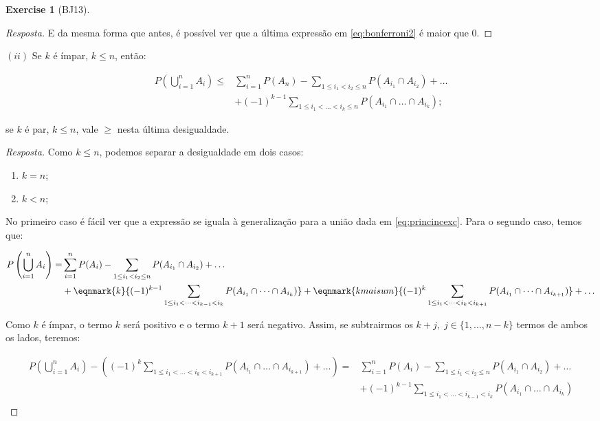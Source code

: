 \documentclass[
]{article}
\providecommand{\tightlist}{%
  \setlength{\itemsep}{0pt}\setlength{\parskip}{0pt}}
\theoremstyle{definition}
\theoremstyle{definition}
\theoremstyle{definition}
\newtheorem{exercise}{Exercise}[section]
\theoremstyle{definition}
\theoremstyle{remark}
\begin{document}
\begin{exercise}[BJ13]
\begin{proof}[Resposta]
E da mesma forma que antes, é possível ver que a última expressão em \eqref{eq:bonferroni2} é maior que 0.
\end{proof}

\((ii)\) Se \(k\) é ímpar, \(k \le n\), então:

\begin{align*}
P\left(\bigcup_{i=1}^{n} A_{i}\right) \le &\sum_{i=1}^{n}P(A_{n}) - \sum_{1 \le i_{1} < i_{2} \le n}P(A_{i_{1}} \cap A_{i_{2}}) + \dots \\
&+ (-1)^{k-1} \sum_{1 \le i_{1} < \dots < i_{k} \le n}P(A_{i_{1}} \cap \dots \cap A_{i_{k}});
\end{align*}

se \(k\) é par, \(k \le n\), vale \(\ge\) nesta última desigualdade.

\begin{proof}[Resposta]
Como \(k \le n\), podemos separar a desigualdade em dois casos:

\begin{enumerate}
\def\labelenumi{\arabic{enumi}.}
\tightlist
\item
  \(k = n\);
\item
  \(k < n\);
\end{enumerate}

No primeiro caso é fácil ver que a expressão se iguala à generalização para a união dada em \eqref{eq:princincexc}. Para o segundo caso, temos que:

\begin{align*}
P\left(\bigcup_{i=1}^{n} A_{i}\right) = &\sum_{i=1}^{n}P(A_{i}) - \sum_{1 \le i_{1} < i_{2} \le n}P(A_{i_{1}} \cap A_{i_{2}}) + \dots \\
&+ \eqnmark{k}{(-1)^{k-1} \sum_{1 \le i_{1} < \dots < i_{k-1} < i_{k}}P(A_{i_{1}} \cap \dots \cap A_{i_{k}})} + \eqnmark{kmaisum}{(-1)^{k} \sum_{1 \le i_{1} < \dots < i_{k} < i_{k+1}}P(A_{i_{1}} \cap \dots \cap A_{i_{k+1}})} + \dots \\
\end{align*}

Como \(k\) é ímpar, o termo \(k\) será positivo e o termo \(k+1\) será negativo. Assim, se subtrairmos os \(k+j,\; j \in\{1,\dots,n-k\}\) termos de ambos os lados, teremos:

\begin{equation*}
\begin{split}
P\left(\bigcup_{i=1}^{n} A_{i}\right) - \left((-1)^{k} \sum_{1 \le i_{1} < \dots < i_{k} < i_{k+1}}P(A_{i_{1}} \cap \dots \cap A_{i_{k+1}}) + \dots \right) = &\sum_{i=1}^{n}P(A_{i}) - \sum_{1 \le i_{1} < i_{2} \le n}P(A_{i_{1}} \cap A_{i_{2}}) + \dots \\
&+ (-1)^{k-1} \sum_{1 \le i_{1} < \dots < i_{k-1} < i_{k}}P(A_{i_{1}} \cap \dots \cap A_{i_{k}}) \\
\end{split}
\end{equation*}


\end{proof}
\end{exercise}
\end{document}

